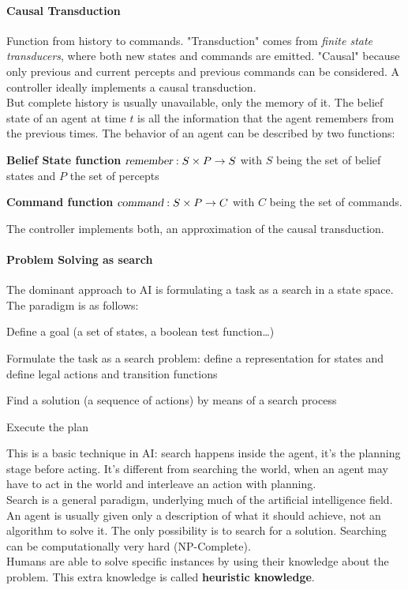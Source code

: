 \documentclass[10pt]{report}
\begin{document}
\paragraph{Causal Transduction} Function from history to commands. "Transduction" comes from \textit{finite state transducers}, where both new states and commands are emitted. "Causal" because only previous and current percepts and previous commands can be considered. A controller ideally implements a causal transduction.\\
But complete history is usually unavailable, only the memory of it. The belief state of an agent at time $t$ is all the information that the agent remembers from the previous times. The behavior of an agent can be described by two functions:
\begin{list}{}{}
	\item \textbf{Belief State function} $\textsl{remember}:S\times P\rightarrow S$ with $S$ being the set of belief states and $P$ the set of percepts
	\item \textbf{Command function} $\textsl{command}:S\times P \rightarrow C$ with $C$ being the set of commands.
\end{list}
The controller implements both, an approximation of the causal transduction.
\paragraph{Problem Solving as search} The dominant approach to AI is formulating a task as a search in a state space. The paradigm is as follows:
\begin{list}{}{}
	\item Define a goal (a set of states, a boolean test function\ldots)
	\item Formulate the task as a search problem: define a representation for states and define legal actions and transition functions
	\item Find a solution (a sequence of actions) by means of a search process
	\item Execute the plan
\end{list}
This is a basic technique in AI: search happens inside the agent, it's the planning stage before acting. It's different from searching the world, when an agent may have to act in the world and interleave an action with planning.\\
Search is a general paradigm, underlying much of the artificial intelligence field. An agent is usually given only a description of what it should achieve, not an algorithm to solve it. The only possibility is to search for a solution. Searching can be computationally very hard (NP-Complete).\\
Humans are able to solve specific instances by using their knowledge about the problem. This extra knowledge is called \textbf{heuristic knowledge}.
\end{document}

